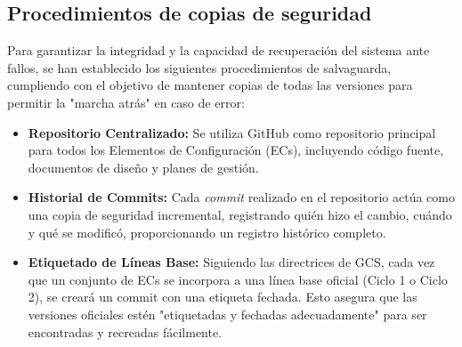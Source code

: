 \documentclass[11pt,a4paper]{article}
\begin{document}
\subsection{Procedimientos de copias de seguridad}

Para garantizar la integridad y la capacidad de recuperación del sistema ante fallos, se han establecido los siguientes procedimientos de salvaguarda, cumpliendo con el objetivo de mantener copias de todas las versiones para permitir la "marcha atrás" en caso de error:
\begin{itemize}
    \item \textbf{Repositorio Centralizado:} Se utiliza GitHub como repositorio principal para todos los Elementos de Configuración (ECs), incluyendo código fuente, documentos de diseño y planes de gestión.
    \item \textbf{Historial de Commits:} Cada \textit{commit} realizado en el repositorio actúa como una copia de seguridad incremental, registrando quién hizo el cambio, cuándo y qué se modificó, proporcionando un registro histórico completo.
    \item \textbf{Etiquetado de Líneas Base:} Siguiendo las directrices de GCS, cada vez que un conjunto de ECs se incorpora a una línea base oficial (Ciclo 1 o Ciclo 2), se creará un commit con una etiqueta fechada. Esto asegura que las versiones oficiales estén "etiquetadas y fechadas adecuadamente" para ser encontradas y recreadas fácilmente.
\end{itemize}
\end{document}
